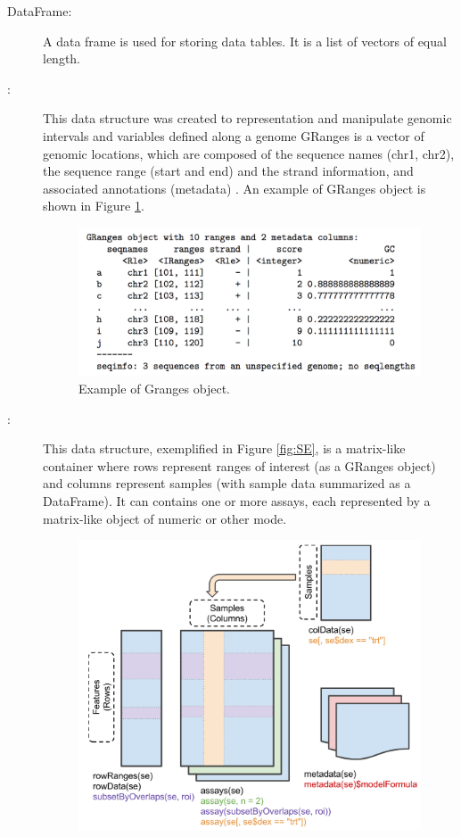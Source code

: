 \begin{description}
  \item [DataFrame:] A data frame is used for storing data tables. It is a list of vectors of equal length.
  \item [:] This data structure was created to representation and manipulate genomic intervals and variables defined along a genome
  GRanges is a vector of genomic locations, which are composed of the sequence names (chr1, chr2), the sequence range (start and end) and the strand information, and associated annotations (metadata) \cite{lawrence2013software}. An example of GRanges object is shown in Figure \ref{fig:granges}.

  \begin{figure}[ht!]
  \centering
  \includegraphics[width=1.0\textwidth]{images/Granges.png}
  \caption[Granges object]{\label{fig:granges} Example of Granges object.}
  \end{figure}
  \item [:]  This data structure, exemplified in Figure \ref{fig:SE}, is a  matrix-like container where rows represent ranges of interest (as a GRanges object) and columns represent samples (with sample data summarized as a DataFrame). It can contains one or more assays, each represented by a matrix-like object of numeric or other mode.
  \begin{figure}[ht!]
  \centering
  \includegraphics[width=1.0\textwidth]{images/summarizedExperiment.png}

\end{figure}
\end{description}
